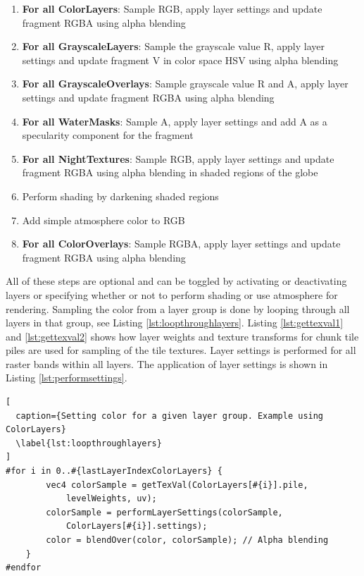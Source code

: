 \begin{enumerate}
\item \textbf{For all ColorLayers}: Sample RGB, apply layer settings and update fragment RGBA using alpha blending
\item \textbf{For all GrayscaleLayers}: Sample the grayscale value R, apply layer settings and update fragment V in color space HSV using alpha blending
\item \textbf{For all GrayscaleOverlays}: Sample grayscale value R and A, apply layer settings and update fragment RGBA using alpha blending
\item \textbf{For all WaterMasks}: Sample A, apply layer settings and add A as a specularity component for the fragment
\item \textbf{For all NightTextures}: Sample RGB, apply layer settings and update fragment RGBA using alpha blending in shaded regions of the globe
\item Perform shading by darkening shaded regions
\item Add simple atmosphere color to RGB
\item \textbf{For all ColorOverlays}: Sample RGBA, apply layer settings and update fragment RGBA using alpha blending

\end{enumerate}

All of these steps are optional and can be toggled by activating or deactivating layers or specifying whether or not to perform shading or use atmosphere for rendering. Sampling the color from a layer group is done by looping through all layers in that group, see Listing \ref{lst:loopthroughlayers}. Listing \ref{lst:gettexval1} and \ref{lst:gettexval2} shows how layer weights and texture transforms for chunk tile piles are used for sampling of the tile textures. Layer settings is performed for all raster bands within all layers. The application of layer settings is shown in Listing \ref{lst:performsettings}.

\begin{lstlisting}[
  caption={Setting color for a given layer group. Example using ColorLayers} 
  \label{lst:loopthroughlayers}
]
#for i in 0..#{lastLayerIndexColorLayers} {
		vec4 colorSample = getTexVal(ColorLayers[#{i}].pile,
			levelWeights, uv);
		colorSample = performLayerSettings(colorSample,
			ColorLayers[#{i}].settings);
		color = blendOver(color, colorSample); // Alpha blending
	}
#endfor
\end{lstlisting}

